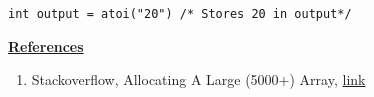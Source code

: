 \documentclass[12pt]{article}
\begin{document}
\begin{enumerate}[1.]
\begin{itemize}
\begin{itemize}
            \texttt{int output = atoi("20") /* Stores 20 in output*/}
        \end{itemize}
    \end{itemize}

    \bigskip

    \underline{\textbf{References}}

    \bigskip

    \begin{enumerate}[1)]
        \item Stackoverflow, Allocating A Large (5000+) Array, \href{https://stackoverflow.com/questions/5746377/allocating-a-large-5000-array}{link}
    \end{enumerate}

\end{enumerate}
\end{document}
